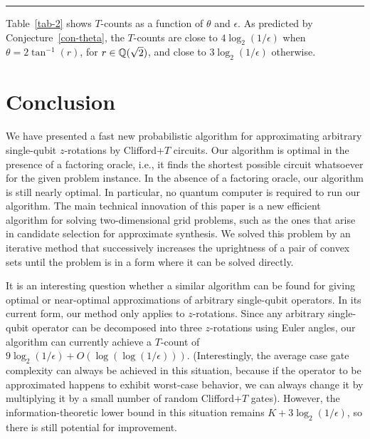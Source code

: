 \documentclass{article}
\begin{document}
\begin{table}
\[

\]
\caption{Worst-case and typical $T$-counts. The top part of the
  table shows the $T$-counts for various combinations of $\theta$ and
  $\epsilon$. The bottom part of the table shows the actual values of
  $4\log_2(1/\epsilon)$ and $3\log_2(1/\epsilon)$ for each
  $\epsilon$, rounded to the closest integer. As predicted by
  Conjecture~\ref{con-theta}, the
  $T$-counts are close to $4\log_2(1/\epsilon)$ when
  $\theta=2\tan^{-1}(r)$, for $r\in\Q(\sqrt2)$, and close to
  $3\log_2(1/\epsilon)$ otherwise.}
\label{tab-2}
\rule{\textwidth}{0.1mm}
\end{table}

Table~\ref{tab-2} shows $T$-counts as a function of $\theta$ and
$\epsilon$. As predicted by Conjecture~\ref{con-theta}, the $T$-counts
are close to $4\log_2(1/\epsilon)$ when $\theta=2\tan^{-1}(r)$, for
$r\in\Q(\sqrt2)$, and close to $3\log_2(1/\epsilon)$ otherwise.


\section{Conclusion}

We have presented a fast new probabilistic algorithm for approximating
arbitrary single-qubit $z$-rotations by Clif\-ford+$T$ circuits. Our
algorithm is optimal in the presence of a factoring oracle, i.e., it
finds the shortest possible circuit whatsoever for the given problem
instance. In the absence of a factoring oracle, our algorithm is still
nearly optimal. In particular, no quantum computer is required to run
our algorithm.  The main technical innovation of this paper is a new
efficient algorithm for solving two-dimensional grid problems, such as
the ones that arise in candidate selection for approximate synthesis.
We solved this problem by an iterative method that successively
increases the uprightness of a pair of convex sets until the problem
is in a form where it can be solved directly.

It is an interesting question whether a similar algorithm can be found
for giving optimal or near-optimal approximations of arbitrary
single-qubit operators. In its current form, our method only applies
to $z$-rotations. Since any arbitrary single-qubit operator can be
decomposed into three $z$-rotations using Euler angles, our algorithm
can currently achieve a $T$-count of $9\log_2(1/\epsilon) +
O(\log(\log(1/\epsilon)))$. (Interestingly, the average case gate
complexity can always be achieved in this situation, because if the
operator to be approximated happens to exhibit worst-case behavior, we
can always change it by multiplying it by a small number of random
Clifford+$T$ gates). However, the information-theoretic lower bound in
this situation remains $K+3\log_2(1/\epsilon)$, so there is still
potential for improvement.
\end{document}

